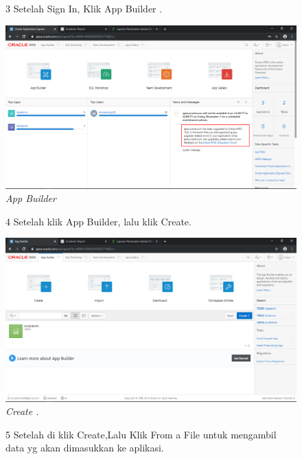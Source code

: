 \begin{enumerate}
\begin{figure}[!htbp]
\item[3] Setelah Sign In, Klik App Builder .

    \begin{center}
\includegraphics[scale=0.2]{figures/2.png}
    \caption{\textit{App Builder}}
        \end{center}
\label{gambar}
\end{figure}

\begin{figure}
\item[4] Setelah klik App Builder, lalu klik Create.

    \begin{center}
\includegraphics[scale=0.2]{figures/4.png}
    \caption{\textit{Create .}}
        \end{center}
\label{gambar}
\end{figure}

\begin{figure}
\item[5] Setelah di klik Create,Lalu Klik From a File untuk mengambil data yg akan dimasukkan ke aplikasi.


\end{figure}
\end{enumerate}

